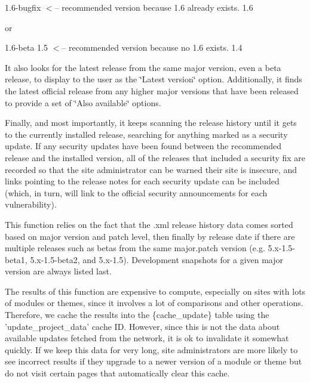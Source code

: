 1.6-bugfix $<$-- recommended version because 1.6 already exists. 1.6

or

1.6-beta 1.5 $<$-- recommended version because no 1.6 exists. 1.4

It also looks for the latest release from the same major version, even a beta release, to display to the user as the \char`\"{}Latest version\char`\"{} option. Additionally, it finds the latest official release from any higher major versions that have been released to provide a set of \char`\"{}Also available\char`\"{} options.

Finally, and most importantly, it keeps scanning the release history until it gets to the currently installed release, searching for anything marked as a security update. If any security updates have been found between the recommended release and the installed version, all of the releases that included a security fix are recorded so that the site administrator can be warned their site is insecure, and links pointing to the release notes for each security update can be included (which, in turn, will link to the official security announcements for each vulnerability).

This function relies on the fact that the .xml release history data comes sorted based on major version and patch level, then finally by release date if there are multiple releases such as betas from the same major.patch version (e.g. 5.x-1.5-beta1, 5.x-1.5-beta2, and 5.x-1.5). Development snapshots for a given major version are always listed last.

The results of this function are expensive to compute, especially on sites with lots of modules or themes, since it involves a lot of comparisons and other operations. Therefore, we cache the results into the \{cache\_\-update\} table using the 'update\_\-project\_\-data' cache ID. However, since this is not the data about available updates fetched from the network, it is ok to invalidate it somewhat quickly. If we keep this data for very long, site administrators are more likely to see incorrect results if they upgrade to a newer version of a module or theme but do not visit certain pages that automatically clear this cache.

